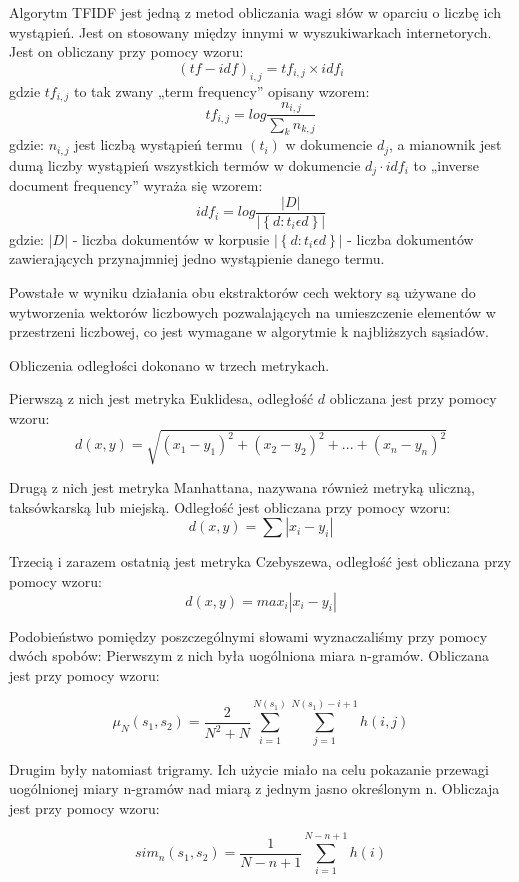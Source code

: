 \documentclass{classrep}
\begin{document}
	Algorytm TFIDF jest jedną z metod obliczania wagi słów w oparciu o liczbę ich wystąpień. Jest on stosowany między innymi w wyszukiwarkach internetorych. Jest on obliczany przy pomocy wzoru:
\[ \left ( tf-idf \right )_{i,j}=tf_{i,j} \times idf_{i} \]
gdzie \( tf_{i,j} \) to tak zwany „term frequency” opisany wzorem:
\[ tf_{i,j}=log \frac{n_{i,j}}{\sum _{k}n_{k,j}} \]
gdzie: \( n_{i,j} \) jest liczbą wystąpień termu \( \left ( t_{i} \right ) \) w dokumencie \( d_{j}\), a mianownik jest dumą liczby wystąpień wszystkich termów w dokumencie \( d_{j} \cdot idf_{i} \) to „inverse document frequency” wyraża się wzorem:
\[ idf_{i}=log \frac{|D|}{| \left \{ d: t_{i} \epsilon d \right \} |} \]
gdzie:
\( |D| \) - liczba dokumentów w korpusie
\( | \left \{ d: t_{i} \epsilon d \right \} | \) - liczba dokumentów zawierających przynajmniej jedno wystąpienie danego termu.

	Powstałe w wyniku działania obu ekstraktorów cech wektory są używane do wytworzenia wektorów liczbowych pozwalających na umieszczenie elementów w przestrzeni liczbowej, co jest wymagane w algorytmie k najbliższych sąsiadów.
	
	Obliczenia odległości dokonano w trzech metrykach.
	
	Pierwszą z nich jest metryka Euklidesa, odległość \( d \) obliczana jest przy pomocy wzoru: 
\[ d\left ( x,y \right )=\sqrt{\left ( x_{1}-y_{1} \right )^{2} + \left ( x_{2}-y_{2} \right )^{2} + ... + \left ( x_{n}-y_{n} \right )^{2}} \]

	Drugą z nich jest metryka Manhattana, nazywana również metryką uliczną, taksówkarską lub miejską. Odległość jest obliczana przy pomocy wzoru:
\[ d\left ( x,y \right )=\sum|x_{i}-y_{i}| \]

	Trzecią i zarazem ostatnią jest metryka Czebyszewa, odległość jest obliczana przy pomocy wzoru:
$$ d(x,y) = max_{i}   |x_{i}-y_{i}| $$

	Podobieństwo pomiędzy poszczególnymi słowami wyznaczaliśmy przy pomocy dwóch spobów:
Pierwszym z nich była uogólniona miara n-gramów. Obliczana jest przy pomocy wzoru:

$$ \mu_{N}(s_{1}, s_{2})= \frac{2}{N^{2} + N}  \sum_{i=1}^{N(s_{1})} \sum_{j=1}^{N(s_{1})-i+1}  h(i,j) $$

Drugim były natomiast trigramy. Ich użycie miało na celu pokazanie przewagi uogólnionej miary n-gramów nad miarą z jednym jasno określonym n. Obliczaja jest przy pomocy wzoru:

$$ sim_{n}(s_{1}, s_{2}) = \frac{1}{N - n + 1} \sum_{i = 1}^{N-n+1} h(i) $$
\end{document}
